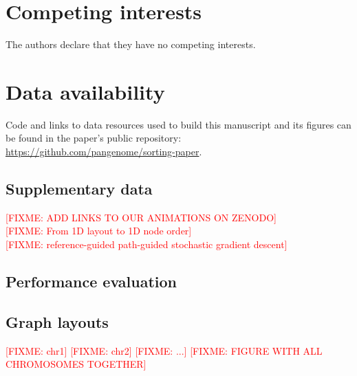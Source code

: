 \documentclass{bioinfo}
\theoremstyle{definition}
\newcommand{\red}[1]{{\textcolor{Red}{#1}}}
\newcommand{\FIXME}[1]{\red{[FIXME: #1]}}
\begin{document}
	\section*{Competing interests}
	The authors declare that they have no competing interests.
	
	\section*{Data availability}
	
	Code and links to data resources used to build this manuscript and its figures can be found in the paper's public repository: \url{https://github.com/pangenome/sorting-paper}.
		
	
	
	
	
	\begin{appendices}
	    \section{Supplementary data}
		\FIXME{ADD LINKS TO OUR ANIMATIONS ON ZENODO} \\
	    \FIXME{From 1D layout to 1D node order} \\
	    \FIXME{reference-guided path-guided stochastic gradient descent}
	    \subsection{Performance evaluation}
	    \label{sec:performance}
	    
		\subsection{Graph layouts}
		\FIXME{chr1}
		\FIXME{chr2}
		\FIXME{...}
		\FIXME{FIGURE WITH ALL CHROMOSOMES TOGETHER}
	\end{appendices}
\end{document}

